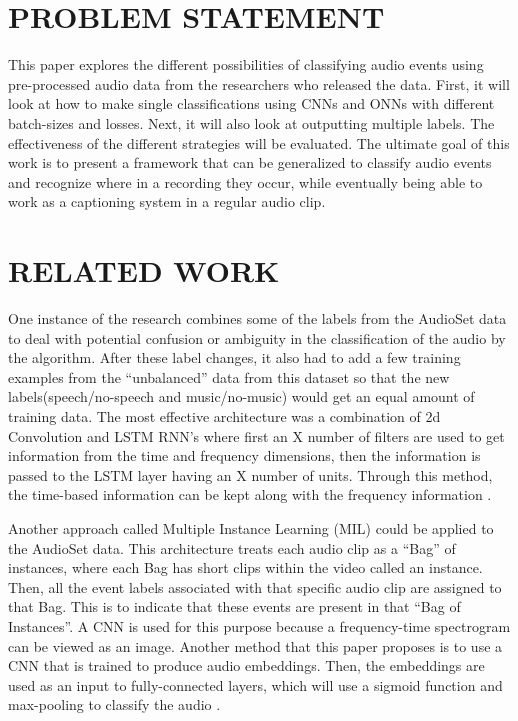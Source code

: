 \documentclass[journal]{IEEEtran}
\begin{document}
\section{PROBLEM STATEMENT}

This paper explores the different possibilities of classifying audio events using pre-processed audio data from the researchers who released the data. First, it will look at how to make single classifications using CNNs and ONNs with different batch-sizes and losses. Next, it will also look at outputting multiple labels. The effectiveness of the different strategies will be evaluated. The ultimate goal of this work is to present a framework that can be generalized to classify audio events and recognize where in a recording they occur, while eventually being able to work as a captioning system in a regular audio clip.

\section{RELATED WORK}

One instance of the research combines some of the labels from the AudioSet data to deal with potential confusion or ambiguity in the classification of the audio by the algorithm. After these label changes, it also had to add a few training examples from the “unbalanced” data from this dataset so that the new labels(speech/no-speech and music/no-music) would get an equal amount of training data. 
The most effective architecture was a combination of 2d Convolution and LSTM RNN’s where first an X number of filters are used to get information from the time and frequency dimensions, then the information is passed to the LSTM layer having an X number of units. Through this method, the time-based information can be kept along with the frequency information \cite{1}.

Another approach called Multiple Instance Learning (MIL) could be applied to the AudioSet data. This architecture treats each audio clip as a “Bag” of instances, where each Bag has short clips within the video called an instance. Then, all the event labels associated with that specific audio clip are assigned to that Bag. This is to indicate that these events are present in that “Bag of Instances”.
A CNN is used for this purpose because a frequency-time spectrogram can be viewed as an image. Another method that this paper proposes is to use a CNN that is trained to produce audio embeddings. Then, the embeddings are used as an input to fully-connected layers, which will use a sigmoid function and max-pooling to classify the audio \cite{2}.
\end{document}

